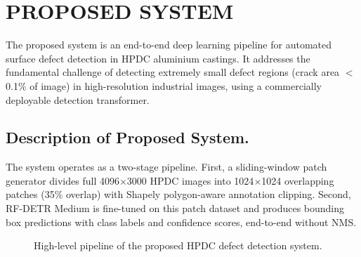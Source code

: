 \chapter{PROPOSED SYSTEM}

\justify

The proposed system is an end-to-end deep learning pipeline for automated surface defect detection in HPDC aluminium castings. It addresses the fundamental challenge of detecting extremely small defect regions (crack area $<$ 0.1\% of image) in high-resolution industrial images, using a commercially deployable detection transformer.

\section{Description of Proposed System.}
\justify

The system operates as a two-stage pipeline. First, a sliding-window patch generator divides full 4096$\times$3000 HPDC images into 1024$\times$1024 overlapping patches (35\% overlap) with Shapely polygon-aware annotation clipping. Second, RF-DETR Medium is fine-tuned on this patch dataset and produces bounding box predictions with class labels and confidence scores, end-to-end without NMS.

\begin{figure}[H]
\centering
{}
\caption{High-level pipeline of the proposed HPDC defect detection system.}
\label{fig:system_overview}
\end{figure}

